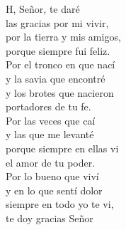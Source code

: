 \begin{cancion}%
	H, Señor, te daré \\
las gracias por mi vivir,\\
por la tierra y mis amigos, \\
porque siempre fui feliz.\\
Por el tronco en que nací \\
y la savia que encontré\\
y los brotes que nacieron \\
portadores de tu fe.\\
Por las veces que caí \\
y las que me levanté\\
porque siempre en ellas vi \\
el amor de tu poder.\\
Por lo bueno que viví \\
y en lo que sentí dolor\\
siempre en todo yo te vi, \\
te doy gracias Señor\\
\end{cancion}%

